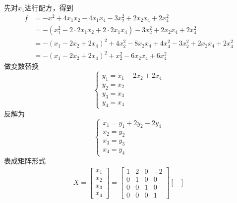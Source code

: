 \documentclass{article}
\begin{document}
\begin{itemize}
        先对$x_1$进行配方，得到
        \begin{align*}
          f
           & = - x^2 + 4 x_1 x_2 - 4 x_1 x_4 - 3x_2^2 + 2 x_2 x_4 + 2 x_4^2                            \\
           & = -(x_1 ^ 2 - 2 \cdot 2 x_1 x_2 + 2 \cdot 2 x_1 x_4) - 3x_2^2 + 2 x_2 x_4 + 2 x_4^2       \\
           & = -(x_1 - 2 x_2 + 2 x_4)^2 + 4 x_2^2 - 8 x_2 x_4 + 4 x_4^2 - 3x_2^2 + 2 x_2 x_4 + 2 x_4^2 \\
           & = -(x_1 - 2 x_2 + 2 x_4)^2 + x_2^2 - 6 x_2 x_4 + 6 x_4^2
        \end{align*}
        做变数替换
        \begin{equation*}
          \begin{cases*}
            y_1 = x_1 - 2 x_2 + 2 x_4 \\
            y_2 = x_2                 \\
            y_3 = x_3                 \\
            y_4 = x_4
          \end{cases*}
        \end{equation*}
        反解为
        \begin{equation*}
          \begin{cases}
            x_1 = y_1 + 2 y_2 - 2 y_4 \\
            x_2 = y_2                 \\
            x_3 = y_3                 \\
            x_4 = y_4
          \end{cases}
        \end{equation*}
        表成矩阵形式
        \begin{align*}
          X = \begin{bmatrix}
                x_1 \\
                x_2 \\
                x_3 \\
                x_4
              \end{bmatrix}
          = \begin{bmatrix}
              1 & 2 & 0 & -2 \\
              0 & 1 & 0 & 0  \\
              0 & 0 & 1 & 0  \\
              0 & 0 & 0 & 1
            \end{bmatrix}
          \begin{bmatrix}

\end{bmatrix}
\end{align*}
\end{itemize}
\end{document}
